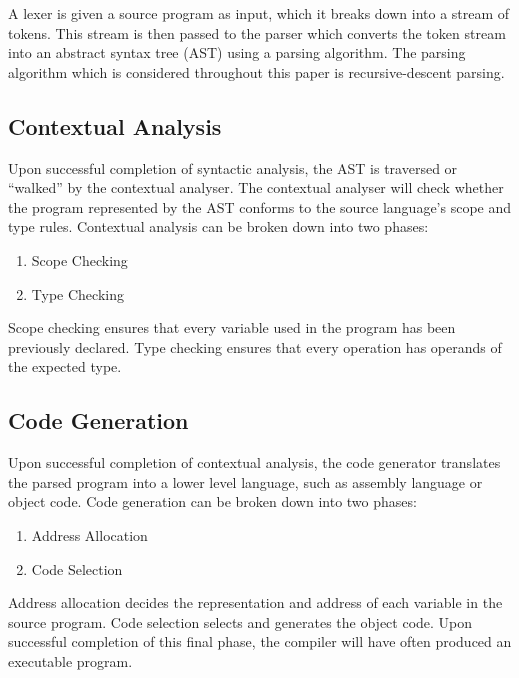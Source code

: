 \documentclass{l4proj}
\begin{document}
\begin{appendices}
A lexer is given a source program as input, which it breaks down into a stream of tokens. This stream is then passed to the parser which converts the token stream into an abstract syntax tree (AST) using a parsing algorithm. The parsing algorithm which is considered throughout this paper is recursive-descent parsing.

\subsection{Contextual Analysis}
Upon successful completion of syntactic analysis, the AST is traversed or ``walked'' by the contextual analyser. The contextual analyser will check whether the program represented by the AST conforms to the source language's scope and type rules. Contextual analysis can be broken down into two phases:
\begin{enumerate}
\item Scope Checking
\item Type Checking
\end{enumerate}

Scope checking ensures that every variable used in the program has been previously declared. Type checking ensures that every operation has operands of the expected type.

\subsection{Code Generation}
Upon successful completion of contextual analysis, the code generator translates the parsed program into a lower level language, such as assembly language or object code. Code generation can be broken down into two phases:
\begin{enumerate}
\item Address Allocation
\item Code Selection
\end{enumerate}

Address allocation decides the representation and address of each variable in the source program. Code selection selects and generates the object code. Upon successful completion of this final phase, the compiler will have often produced an executable program.
\end{appendices}



%
\end{document}
